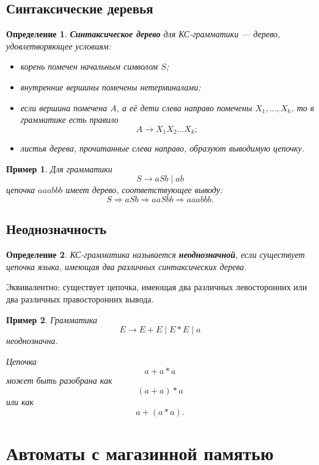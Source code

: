 \documentclass[12pt,a4paper]{article}
\newtheorem{definition}{Определение}
\newtheorem{example}{Пример}
\newcommand{\derives}{\Rightarrow}
\begin{document}
\subsection{Синтаксические деревья}

\begin{definition}
\textbf{Синтаксическое дерево} для КС-грамматики --- дерево, удовлетворяющее условиям:
\begin{itemize}
    \item корень помечен начальным символом $S$;
    \item внутренние вершины помечены нетерминалами;
    \item если вершина помечена $A$, а её дети слева направо помечены $X_1,\ldots,X_k$, то в грамматике есть правило
    \[
    A\to X_1X_2\ldots X_k;
    \]
    \item листья дерева, прочитанные слева направо, образуют выводимую цепочку.
\end{itemize}
\end{definition}

\begin{example}
Для грамматики
\[
S\to aSb\mid ab
\]
цепочка $aaabbb$ имеет дерево, соответствующее выводу:
\[
S\derives aSb\derives aaSbb\derives aaabbb.
\]
\end{example}

\subsection{Неоднозначность}

\begin{definition}
КС-грамматика называется \textbf{неоднозначной}, если существует цепочка языка, имеющая два различных синтаксических дерева.
\end{definition}

Эквивалентно: существует цепочка, имеющая два различных левосторонних или два различных правосторонних вывода.

\begin{example}
Грамматика
\[
E\to E+E\mid E*E\mid a
\]
неоднозначна.

Цепочка
\[
a+a*a
\]
может быть разобрана как
\[
(a+a)*a
\]
или как
\[
a+(a*a).
\]
\end{example}

\section{Автоматы с магазинной памятью}
\end{document}
